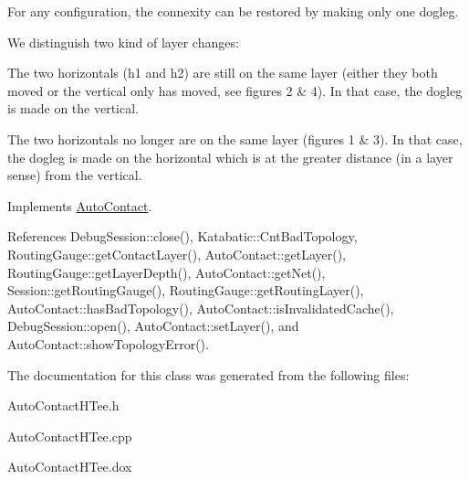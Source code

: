 For any configuration, the connexity can be restored by making only one dogleg.

We distinguish two kind of layer changes\-:
\begin{DoxyEnumerate}
\item The two horizontals ({\ttfamily h1} and {\ttfamily h2}) are still on the same layer (either they both moved or the vertical only has moved, see figures 2 \& 4). In that case, the dogleg is made on the vertical.
\item The two horizontals no longer are on the same layer (figures 1 \& 3). In that case, the dogleg is made on the horizontal which is at the greater distance (in a layer sense) from the vertical.
\end{DoxyEnumerate}

 

Implements \hyperlink{classKatabatic_1_1AutoContact_a690764ddc997fe9766a79c4b8e0c3e2f}{Auto\-Contact}.



References Debug\-Session\-::close(), Katabatic\-::\-Cnt\-Bad\-Topology, Routing\-Gauge\-::get\-Contact\-Layer(), Auto\-Contact\-::get\-Layer(), Routing\-Gauge\-::get\-Layer\-Depth(), Auto\-Contact\-::get\-Net(), Session\-::get\-Routing\-Gauge(), Routing\-Gauge\-::get\-Routing\-Layer(), Auto\-Contact\-::has\-Bad\-Topology(), Auto\-Contact\-::is\-Invalidated\-Cache(), Debug\-Session\-::open(), Auto\-Contact\-::set\-Layer(), and Auto\-Contact\-::show\-Topology\-Error().



The documentation for this class was generated from the following files\-:\begin{DoxyCompactItemize}
\item 
Auto\-Contact\-H\-Tee.\-h\item 
Auto\-Contact\-H\-Tee.\-cpp\item 
Auto\-Contact\-H\-Tee.\-dox\end{DoxyCompactItemize}
